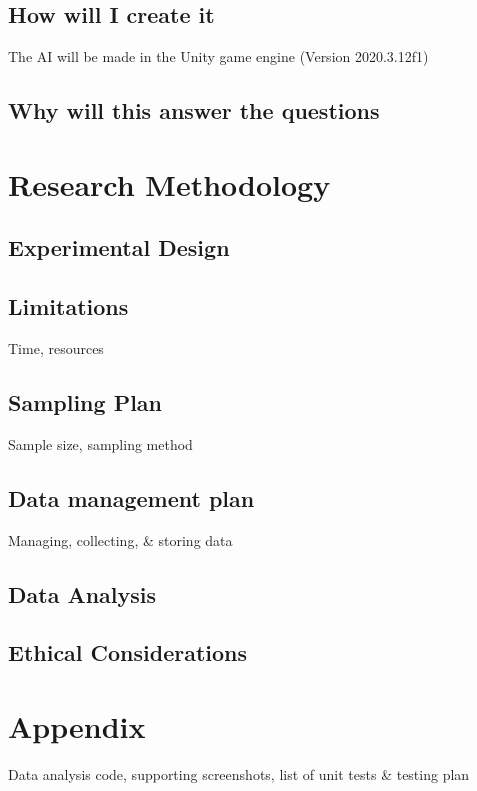 \documentclass[journal]{IEEEtran}
\begin{document}
    \subsection{How will I create it}
        The AI will be made in the Unity game engine (Version 2020.3.12f1)

    \subsection{Why will this answer the questions}

\section{Research Methodology}
    \subsection{Experimental Design}

    \subsection{Limitations}
        Time, resources

    \subsection{Sampling Plan}
        Sample size, sampling method

    \subsection{Data management plan}
        Managing, collecting, \& storing data

    \subsection{Data Analysis}

    \subsection{Ethical Considerations}

\section{Appendix}
    Data analysis code, supporting screenshots, list of unit tests \& testing plan



\end{document}
